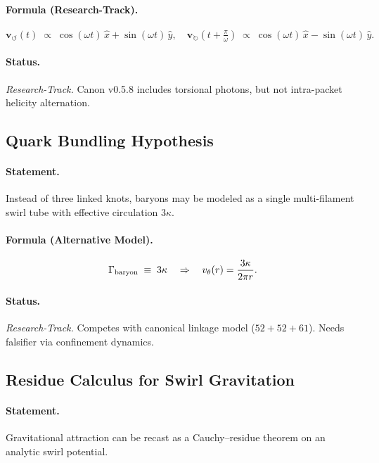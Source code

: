\documentclass[10pt,reprint,aps,onecolumn,nofootinbib]{revtex4-2}
\begin{document}
    \paragraph{Formula (Research-Track).}
        \[
            \mathbf{v}_{\!\boldsymbol{\circlearrowleft}}(t) \;\propto\;
            \cos(\omega t)\,\hat{x} + \sin(\omega t)\,\hat{y},
            \quad
            \mathbf{v}_{\!\boldsymbol{\circlearrowright}}(t+\tfrac{\pi}{\omega})\;\propto\;
            \cos(\omega t)\,\hat{x} - \sin(\omega t)\,\hat{y}.
        \]

    \paragraph{Status.} \emph{Research-Track.} Canon v0.5.8 includes torsional photons, but not
        intra-packet helicity alternation.

    \subsection{Quark Bundling Hypothesis}
    \paragraph{Statement.}
        Instead of three linked knots, baryons may be modeled as a single multi-filament swirl tube
        with effective circulation $3\kappa$.

    \paragraph{Formula (Alternative Model).}
        \[
            \Gamma_{\rm baryon} \;\equiv\; 3\kappa
            \quad\Rightarrow\quad
            v_\theta(r) = \frac{3\kappa}{2\pi r}.
        \]

    \paragraph{Status.} \emph{Research-Track.} Competes with canonical linkage model
        ($52+52+61$). Needs falsifier via confinement dynamics.

    \subsection{Residue Calculus for Swirl Gravitation}
    \paragraph{Statement.}
        Gravitational attraction can be recast as a Cauchy–residue theorem on an analytic swirl potential.
\end{document}
